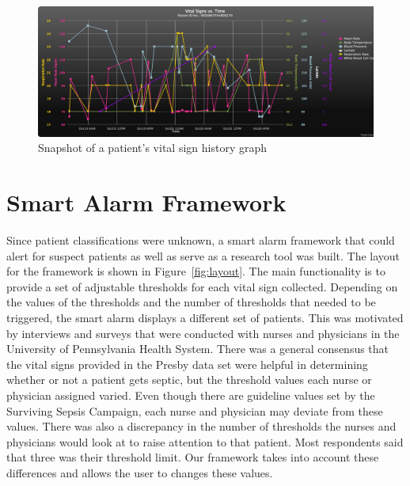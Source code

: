 \documentclass{sig-alternate}
\begin{document}
\begin{figure}
	\begin{center}
		\includegraphics[width=1.0\linewidth]{patientGraph.png}
	\end{center}
	\caption{Snapshot of a patient's vital sign history graph}
	\label{fig:patient_graph}
\end{figure}

\vspace{10pt}
\section{Smart Alarm Framework}
\vspace{10pt}
\label{sec:framework}

Since patient classifications were unknown, a smart alarm framework that could alert for suspect patients as well as serve as a research tool was built.  The layout for the framework is shown in Figure~\ref{fig:layout}.  The main functionality is to provide a set of adjustable thresholds for each vital sign collected.  Depending on the values of the thresholds and the number of thresholds that needed to be triggered, the smart alarm displays a different set of patients.  This was motivated by interviews and surveys that were conducted with nurses and physicians in the University of Pennsylvania Health System.  There was a general consensus that the vital signs provided in the Presby data set were helpful in determining whether or not a patient gets septic, but the threshold values each nurse or physician assigned varied.  Even though there are guideline values set by the Surviving Sepsis Campaign, each nurse and physician may deviate from these values.  There was also a discrepancy in the number of thresholds the nurses and physicians would look at to raise attention to that patient.  Most respondents said that three was their threshold limit.  Our framework takes into account these differences and allows the user to changes these values.
\end{document}
